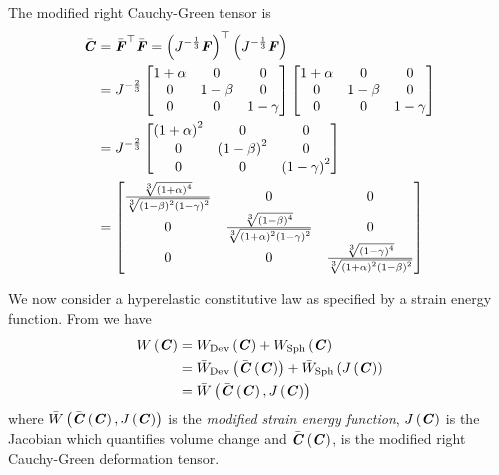 The modified right Cauchy-Green tensor is
\begin{equation}
  \begin{split}
    \bar{\tensor{C}} &= \transpose{\bar{\tensor{F}}}\bar{\tensor{F}}=
    \transpose{\pbrac{J^{-\frac{1}{3}}\tensor{F}}}\pbrac{J^{-\frac{1}{3}}\tensor{F}}\\
    &= J^{-\frac{2}{3}}\begin{bmatrix}
      1+\alpha & 0 & 0 \\
      0 & 1-\beta & 0 \\
      0 & 0 & 1-\gamma
    \end{bmatrix}\begin{bmatrix}
      1+\alpha & 0 & 0 \\
      0 & 1-\beta & 0 \\
      0 & 0 & 1-\gamma
    \end{bmatrix}\\
    &=J^{-\frac{2}{3}}\begin{bmatrix}
      \pbrac{1+\alpha}^{2} & 0 & 0 \\
      0 & \pbrac{1-\beta}^{2} & 0 \\
      0 & 0 & \pbrac{1-\gamma}^{2}
    \end{bmatrix} \\
     &=\begin{bmatrix}
    \frac{\cuberoot{\pbrac{1+\alpha}^{4}}}{\cuberoot{\pbrac{1-\beta}^{2}\pbrac{1-\gamma}^{2}}}
    & 0 & 0 \\
    0 & \frac{\cuberoot{\pbrac{1-\beta}^{4}}}{\cuberoot{\pbrac{1+\alpha}^{2}\pbrac{1-\gamma}^{2}}}
    & 0  \\
    0 & 0 & \frac{\cuberoot{\pbrac{1-\gamma}^{4}}}{\cuberoot{\pbrac{1+\alpha}^{2}\pbrac{1-\beta}^{2}}}
    \end{bmatrix}
  \end{split}
  \label{eqn:FiniteElasticityUniaxialCubeModRightCachyGreen}
\end{equation}

We now consider a hyperelastic constitutive law as specified by a
strain energy function. From
 we have
\begin{equation}
  \begin{split}
     W\left( \boldsymbol{\mathit{C}} \right)  &=
     W_{\operatorname{Dev}}\left( \boldsymbol{\mathit{C}} \right) + W_{\operatorname{Sph}}\left( \boldsymbol{\mathit{C}} \right)  \\
    &= \bar{W}_{\operatorname{Dev}}\left(  \bar{\boldsymbol{\mathit{C}}}\left( \boldsymbol{\mathit{C}} \right)  \right) + \bar{W}_{\operatorname{Sph}}\left(  J\left( \boldsymbol{\mathit{C}} \right)  \right) \\
    &= \bar{W}\left(  \bar{\boldsymbol{\mathit{C}}}\left( \boldsymbol{\mathit{C}} \right) , J\left( \boldsymbol{\mathit{C}} \right)  \right) 
  \end{split}
\end{equation}
where
$ \bar{W}\left(  \bar{\boldsymbol{\mathit{C}}}\left( \boldsymbol{\mathit{C}} \right) , J\left( \boldsymbol{\mathit{C}} \right)  \right) $
is the \emph{modified strain energy function}, $ J\left( \boldsymbol{\mathit{C}} \right) $
is the Jacobian which quantifies volume change and
$ \bar{\boldsymbol{\mathit{C}}}\left( \boldsymbol{\mathit{C}} \right) $, is the modified right
Cauchy-Green deformation tensor.


